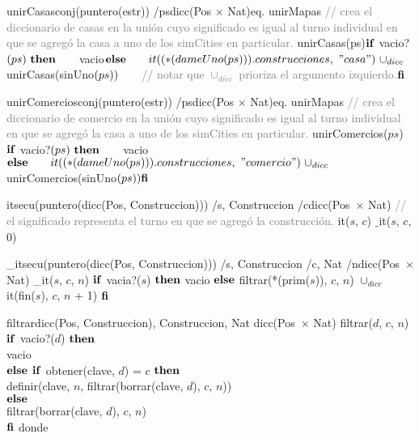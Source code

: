 \vspace{4mm}
\tadOperacion
{unirCasas}{conj(puntero(estr)) /ps}{dicc(Pos $\times$ Nat)}{eq. unirMapas}          
\textcolor{gray}{// crea el diccionario de casas en la unión cuyo significado es igual al turno individual en \\ \tab que se agregó la casa a uno de los simCities en particular.}
\tadAxioma
{unirCasas(ps)}{$
    \LIF\ $vacio?$(ps)\ \textrm{\textbf{then}}\ \\ 
    \hspace*{7mm} $vacio$\ \\
    \LELSE\ \\
    \tab it((*(dameUno(ps))).construcciones,\ "casa")\ \cup_{dicc}\ $unirCasas(sinUno$(ps))\ \\
    \hspace*{7mm} $\textcolor{gray}{// notar que $\cup_{dicc}$ prioriza el argumento izquierdo.}$ \\
    \textrm{\textbf{fi}}
$}

\vspace{4mm}
\tadOperacion
{unirComercios}{conj(puntero(estr)) /ps}{dicc(Pos $\times$ Nat)}{eq. unirMapas} 
\textcolor{gray}{// crea el diccionario de comercio en la unión cuyo significado es igual al turno individual \\ \tab en que se agregó la casa a uno de los simCities en particular.}
\tadAxioma
{unirComercios($ps$)}{$
    \LIF\ $vacio?$(ps)\ \textrm{\textbf{then}}\ \\
    \hspace*{7mm} $vacio$\ \\
    \LELSE\ \\
    \tab it((*(dameUno(ps))).construcciones,\ "comercio")\ \cup_{dicc}\ $unirComercios(sinUno$(ps))\ \\
    \textrm{\textbf{fi}}
$}

\vspace{4mm}
\tadOperacion
{it}{secu(puntero(dicc(Pos, Construccion))) /s, Construccion /c}{dicc(Pos\ $\times$ Nat)}{}
\textcolor{gray}{// el significado representa el turno en que se agregó la construcción.}  
\tadAxioma
{it($s$, $c$)}{
    $\_$it($s$, $c$, 0)
}

\vspace{4mm}
\tadOperacion
{\_it}{secu(puntero(dicc(Pos, Construccion))) /s, Construccion /c, Nat /n}{dicc(Pos\ $\times$ Nat)}{}
\tadAxioma
{\_it($s$, $c$, $n$)}{
    $\textrm{\textbf{if}}$ vacia?($s$) $\textrm{\textbf{then}}$ 
        vacio 
    $\textrm{\textbf{else}}$ 
        filtrar(*(prim($s$)), $c$, $n$) $\cup_{dicc}$ it(fin($s$), $c$, $n$ + 1) 
    $\textrm{\textbf{fi}}$
}

\vspace{4mm}
\tadOperacion
{filtrar}{dicc(Pos, Construccion), Construccion, Nat }{dicc(Pos\ $\times$ Nat)}{}
\tadAxioma
{filtrar($d$, $c$, $n$)}{
    $\textrm{\textbf{if}}$ vacio?($d$) $\textrm{\textbf{then}}$ \\ 
    \tab vacio \\
    $\textrm{\textbf{else}}$ $\textrm{\textbf{if}}$ obtener(clave, $d$) = $c$ $\textrm{\textbf{then}}$ \\ 
    \tab definir(clave, $n$, filtrar(borrar(clave, $d$), $c$, $n$)) \\
    $\textrm{\textbf{else}}$ \\
    \tab filtrar(borrar(clave, $d$), $c$, $n$) \\
    $\textrm{\textbf{fi}}$
}
donde 

